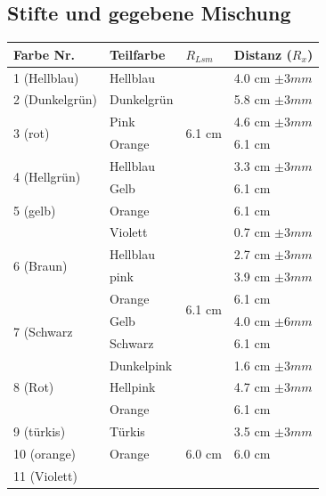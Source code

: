 \documentclass[11pt,paper=a4,final]{scrartcl}
\begin{document}
\subsection{Stifte und gegebene Mischung}
\begin{savenotes} %
  \begin{table}[ht!]
    \centering
    \begin{tabular}{|l|l|l|l|}
      \hline
    \bf Farbe Nr.	& \bf Teilfarbe	& \bf \(R_{Lsm}\)		& \bf Distanz (\(R_x\))	\\ \hline
      1 (Hellblau)	& Hellblau	& \multirow{6}{*}{6.1 cm }	& 4.0 cm \(\pm 3 mm \)	\\ \cline{1-2} \cline{4-4}
      2 (Dunkelgr\"un)	& Dunkelgr\"un	&				& 5.8 cm \(\pm 3 mm \)	\\ \cline{1-2} \cline{4-4}
      \multirow{2}{*}{3 (rot) }
			& Pink		&				& 4.6 cm \(\pm 3 mm \)	\\ 
			& Orange	&				& 6.1 cm 		\\ \cline{1-2} \cline{4-4}
      \multirow{2}{*}{4 (Hellgr\"un) }
 			& Hellblau	&				& 3.3 cm \(\pm 3 mm \)	\\
			& Gelb		&				& 6.1 cm		\\ \hline
      5 (gelb)		& Orange	& \multirow{10}{*}{6.1 cm }	& 6.1 cm		\\ \cline{1-2} \cline{4-4}
      \multirow{4}{*}{6 (Braun)}
			& Violett	&				& 0.7 cm \(\pm 3 mm \)	\\
			& Hellblau	&				& 2.7 cm \(\pm 3 mm \)	\\
      			& pink		&				& 3.9 cm \(\pm 3 mm \)	\\
      			& Orange	&				& 6.1 cm 		\\ \cline{1-2} \cline{4-4}
      \multirow{2}{*}{7 (Schwarz}
      			& Gelb		&				& 4.0 cm \(\pm 6 mm \)	\\
      			& Schwarz	&				& 6.1 cm		\\ \cline{1-2} \cline{4-4}
      \multirow{3}{*}{8 (Rot)}
      			& Dunkelpink	& 				& 1.6 cm \(\pm 3 mm \)	\\ 
      			& Hellpink	&				& 4.7 cm \(\pm 3 mm \)	\\
      			& Orange	&				& 6.1 cm		\\ \hline
      9 (t\"urkis)	& T\"urkis	& \multirow{6}{*}{6.0 cm }	& 3.5 cm \(\pm 3 mm \)	\\ \cline{1-2} \cline{4-4}
       10 (orange)	& Orange	& 				& 6.0 cm		\\ \cline{1-2} \cline{4-4}
      \multirow{3}{*}{11 (Violett)}

\end{tabular}
\end{table}
\end{savenotes}
\end{document}

